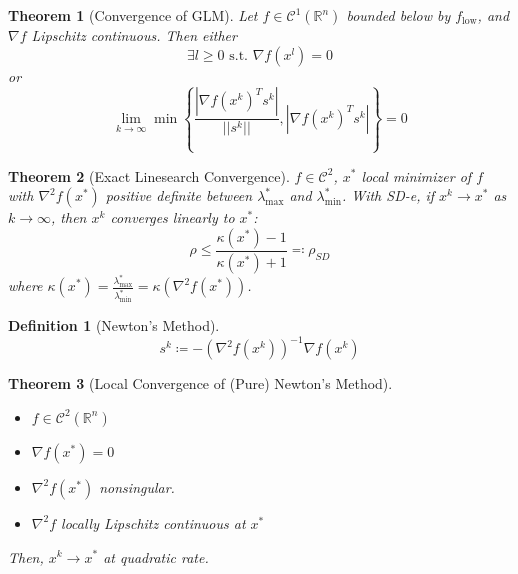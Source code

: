 \documentclass[a4paper]{article}
\newcommand{\R}{\mathbb{R}}
\newcommand{\C}{\mathcal{C}}
\newcommand{\st}{\text{ s.t. }}
\newcommand{\norm}[1]{\lvert \lvert #1 \rvert \rvert}
\newtheorem{theorem}{Theorem}
\newtheorem*{definition*}{Definition}
\begin{document}
\setcounter{theorem}{3}
\begin{theorem}[Convergence of GLM]
    Let $f \in \C^1 \left( \R^n \right)$ bounded below by $f_{\text{low}}$,
    and $\nabla f$ Lipschitz continuous.
    Then either
    \begin{equation*}
        \exists l \geq 0 \st \nabla f \left( x^l \right) = 0
    \end{equation*}
    or
    \begin{equation*}
        \lim_{k \rightarrow \infty} \min \left\{ \frac{|\nabla f \left( x^k \right)^T s^k|}{\norm{s^k}}, |\nabla f \left( x^k \right)^T s^k| \right\} = 0
    \end{equation*}
\end{theorem}

\setcounter{theorem}{5}
\begin{theorem}[Exact Linesearch Convergence]
    $f \in \C^2$, $x^*$ local minimizer of $f$ with $\nabla^2 f\left( x^* \right)$ positive definite between $\lambda_{\max}^*$ and $\lambda_{\min}^{*}$.
    With SD-e, if $x^k \rightarrow x^*$ as $k \rightarrow \infty$, then $x^k$ converges linearly to $x^*$:
    \begin{equation*}
        \rho \leq \frac{\kappa \left( x^* \right) - 1}{\kappa \left( x^* \right) + 1} \eqqcolon \rho_{SD}
    \end{equation*}
    where $\kappa\left( x^* \right) = \frac{\lambda_{\max}^*}{\lambda_{\min}^*} = \kappa \left( \nabla^2 f\left( x^* \right) \right)$.
\end{theorem}

\begin{definition*}[Newton's Method]
    \begin{equation*}
        s^k \coloneqq - \left( \nabla^2 f \left( x^k \right) \right)^{-1} \nabla f \left( x^k \right)
    \end{equation*}
\end{definition*}

\begin{theorem}[Local Convergence of (Pure) Newton's Method]
    \begin{itemize}
        \item $f \in \C^2 \left( \R^n \right)$
        \item $\nabla f \left( x^* \right) = 0$
        \item $\nabla^2 f \left( x^* \right)$ nonsingular.
        \item $\nabla^2 f$ locally Lipschitz continuous at $x^*$
    \end{itemize}
    Then,
    $x^k \rightarrow x^*$ at quadratic rate.
\end{theorem}
\end{document}
